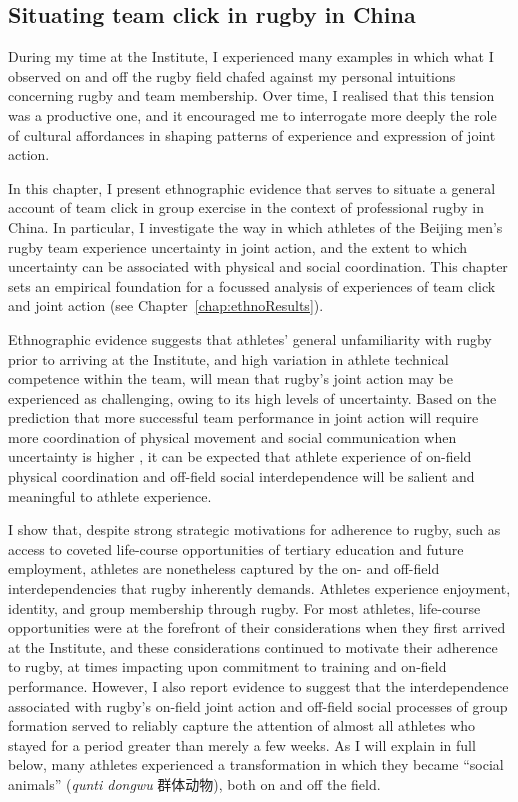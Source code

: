 \begin{CJK}{UTF8}{gbsn}
\section{Situating team click in rugby in China}
During my time at the Institute, I experienced many examples in which what I observed on and off the rugby field chafed against my personal intuitions concerning rugby and team membership.  Over time, I realised that this tension was a productive one, and it encouraged me to interrogate more deeply the role of cultural affordances in shaping patterns of experience and expression of joint action.

In this chapter, I present ethnographic evidence that serves to situate a general account of team click in group exercise in the context of professional rugby in China.  In particular, I investigate the way in which athletes of the Beijing men's rugby team experience uncertainty in joint action, and the extent to which uncertainty can be associated with physical and social coordination.  This chapter sets an empirical foundation for a focussed analysis of experiences of team click and joint action (see Chapter~\ref{chap:ethnoResults}).

Ethnographic evidence suggests that athletes' general unfamiliarity with rugby prior to arriving at the Institute, and high variation in athlete technical competence within the team, will mean that rugby's joint action may be experienced as challenging, owing to its high levels of uncertainty.  Based on the prediction that more successful team performance in joint action will require more coordination of physical movement and social communication when uncertainty is higher \citep{Riley2011}, it can be expected that athlete experience of on-field physical coordination and off-field social interdependence will be salient and meaningful to athlete experience.

I show that, despite strong strategic motivations for adherence to rugby, such as access to coveted life-course opportunities of tertiary education and future employment, athletes are nonetheless captured by the on- and off-field interdependencies that rugby inherently demands.  Athletes experience enjoyment, identity, and group membership through rugby.  For most athletes, life-course opportunities were at the forefront of their considerations when they first arrived at the Institute, and these considerations continued to motivate their adherence to rugby, at times impacting upon commitment to training and on-field performance.  However, I also report evidence to suggest that the interdependence associated with rugby's on-field joint action and off-field social processes of group formation served to reliably capture the attention of almost all athletes who stayed for a period greater than merely a few weeks.  As I will explain in full below,  many athletes experienced a transformation in which they became ``social animals'' (\textit{qunti dongwu} 群体动物), both on and off the field.


\end{CJK}
